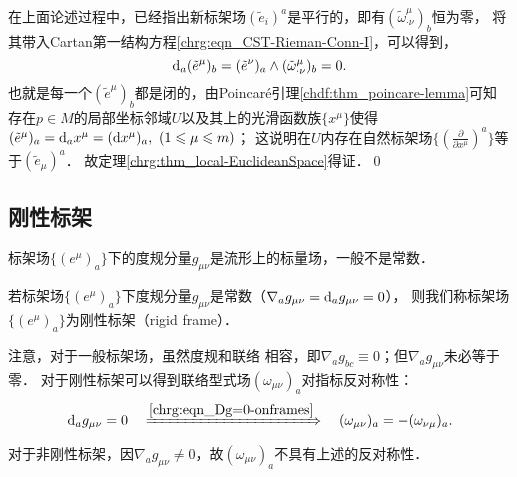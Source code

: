在上面论述过程中，已经指出新标架场$(\tilde{e}_i)^a$是平行的，即有$(\tilde{\omega} _{\cdot \nu}^\mu)_b$恒为零，
将其带入Cartan第一结构方程\eqref{chrg:eqn_CST-Rieman-Conn-I}，可以得到，
\begin{equation}
    {\rm d}_a (\tilde{e}^\mu)_b =(\tilde{e}^\nu)_a \wedge (\tilde{\omega} _{\cdot \nu}^\mu)_b =0 .
\end{equation}
也就是每一个$(\tilde{e}^\mu)_b$都是闭的，由Poincar\'{e}引理\ref{chdf:thm_poincare-lemma}可知
存在$p\in M$的局部坐标邻域$U$以及其上的光滑函数族$\{x^\mu\}$使得
$ (\tilde{e}^\mu)_a = {\rm d}_a x^\mu = ({\rm d} x^\mu)_a, \ (1\leqslant \mu \leqslant m) $；
这说明在$U$内存在自然标架场$\{(\frac{\partial }{\partial x^\mu})^a\}$等于$(\tilde{e}_\mu)^{a}$．
故定理\ref{chrg:thm_local-EuclideanSpace}得证．\qed



\subsection{刚性标架}\label{chrg:sec_rigid-frame}
标架场$\{(e^\mu)_{a}\}$下的度规分量$g_{\mu\nu}$是流形上的标量场，一般不是常数．
\begin{definition}\label{chrg:def_rigid-frame}
    若标架场$\{(e^\mu)_{a}\}$下度规分量$g_{\mu\nu}$是常数（$\nabla_a g_{\mu\nu}={\rm d}_a g_{\mu\nu}=0$），
    则我们称标架场$\{(e^\mu)_{a}\}$为{\heiti 刚性标架}（rigid frame）．
\end{definition}
注意，对于一般标架场，虽然度规和联络
相容，即$\nabla_a g_{bc}\equiv0$；但$\nabla_a g_{\mu\nu}$未必等于零．
对于刚性标架可以得到联络型式场$(\omega _{\mu\nu})_{a}$对指标反对称性：
\begin{equation}\label{chrg:eqn_omega-anti}
    {\rm d}_a g_{\mu\nu}=0 \quad \xRightarrow{\ref{chrg:eqn_Dg=0-onframes}}\quad
    (\omega _{\mu\nu})_{a} = -(\omega _{\nu\mu})_{a} .
\end{equation}
对于非刚性标架，因$\nabla_a g_{\mu\nu}\neq 0$，故$(\omega _{\mu\nu})_{a}$不具有上述的反对称性．


